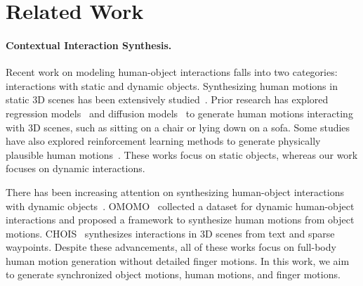\section{Related Work}
\label{sec:related_work}

\paragraph{Contextual Interaction Synthesis.}
Recent work on modeling human-object interactions falls into two categories: interactions with static and dynamic objects. Synthesizing human motions in static 3D scenes has been extensively studied~\cite{prox, wang2022humanise, araujo2023circle, jiang2024scaling, hassan_samp_2021, zhang2022couch}. 
Prior research has explored regression models~\cite{wang2021synthesizing, wang2022towards, hassan_samp_2021, araujo2023circle, mir2023generating} and diffusion models~\cite{huang2023diffusion, jiang2024scaling, yi2024generating, wang2024move} to generate human motions interacting with 3D scenes, such as sitting on a chair or lying down on a sofa. Some studies have also explored reinforcement learning methods to generate physically plausible human motions~\cite{hassan2023synthesizing, zhao2023synthesizing, xiao2024unified}. These works focus on static objects, whereas our work focuses on dynamic interactions.


There has been increasing attention on synthesizing human-object interactions with dynamic objects~\cite{diller2023cg, peng2023hoi, wu2024thor,xu2024interdreamer}. OMOMO~\cite{li2023object} collected a dataset for dynamic human-object interactions and proposed a framework to synthesize human motions from object motions. 
CHOIS~\cite{li2023controllable} synthesizes interactions in 3D scenes from text and sparse waypoints.
Despite these advancements, all of these works focus on full-body human motion generation without detailed finger motions. In this work, we aim to generate synchronized object motions, human motions, and finger motions.

